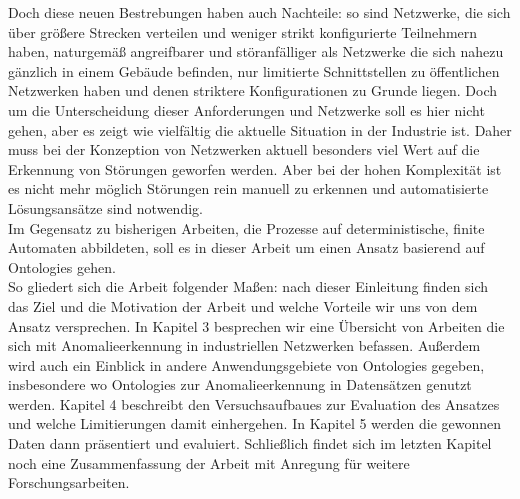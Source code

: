 Doch diese neuen Bestrebungen haben auch Nachteile: so sind Netzwerke, die sich über größere Strecken verteilen und weniger strikt konfigurierte Teilnehmern haben, naturgemäß angreifbarer und störanfälliger als Netzwerke die sich nahezu gänzlich in einem Gebäude befinden, nur limitierte Schnittstellen zu öffentlichen Netzwerken haben und denen striktere Konfigurationen zu Grunde liegen. Doch um die Unterscheidung dieser Anforderungen und Netzwerke soll es hier nicht gehen, aber es zeigt wie vielfältig die aktuelle Situation in der Industrie ist. Daher muss bei der Konzeption von Netzwerken aktuell besonders viel Wert auf die Erkennung von Störungen geworfen werden. Aber bei der hohen Komplexität ist es nicht mehr möglich Störungen rein manuell zu erkennen und automatisierte Lösungsansätze sind notwendig. \\
Im Gegensatz zu bisherigen Arbeiten, die Prozesse auf deterministische, finite Automaten abbildeten\cite{maier2011anomaly, kroll2014system}, soll es in dieser Arbeit um einen Ansatz basierend auf \Glspl{Ontologie} gehen.\\
So gliedert sich die Arbeit folgender Maßen: nach dieser Einleitung finden sich das Ziel und die Motivation der Arbeit und welche Vorteile wir uns von dem Ansatz versprechen. In Kapitel 3 besprechen wir eine Übersicht von Arbeiten die sich mit Anomalieerkennung in industriellen Netzwerken befassen. Außerdem wird auch ein Einblick in andere Anwendungsgebiete von \Glspl{Ontologie} gegeben, insbesondere wo \Glspl{Ontologie} zur Anomalieerkennung in Datensätzen genutzt werden. Kapitel 4 beschreibt den Versuchsaufbaues zur Evaluation des Ansatzes und welche Limitierungen damit einhergehen. In Kapitel 5 werden die gewonnen Daten dann präsentiert und evaluiert. Schließlich findet sich im letzten Kapitel noch eine Zusammenfassung der Arbeit mit Anregung für weitere Forschungsarbeiten.